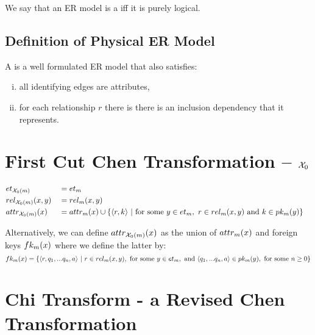 \noindent
We say that an ER model is a  iff it is purely logical.

\subsection{Definition of Physical ER Model}
\begin{definition}
\noindent 
A  is a well formulated ER model that also satisfies:
\begin{enumerate}[(i)]
\item
all identifying edges are attributes, 

\item
for each relationship $r$ there is there is an inclusion dependency that it represents.
\end{enumerate} 
\end{definition}


\section{First Cut Chen Transformation -- $\chiZero$}

\begin{align}
&\et[\chiZeroM]        && = \et        && \\
&\rel[\chiZeroM]{x}{y} && = \rel{x}{y}  &&\\
&\attr[\chiZeroM]{x}   && = \attr{x}  \cup  \setsuchthat{\tuple{r,k}}{\text{for some }
			                  y \in \et, \ r \in \rel{x}{y} \text{ and } k \in \pk{y}} 
\end{align}

Alternatively, we can define $\attr[\chiZeroM]{x}$ as the union of $\attr{x}$ and foreign keys $\fk{x}$
where we define the latter by:
\begin{equation}
\fk{x} = \setsuchthat{\tuple{r,q_1,...q_n,a}}
                               {r \in \rel{x}{y},
                                  \text{ for some } y \in \et,
																	\text{ and } \tuple{q_1,...q_n,a} \in \pk{y},
																	\text{ for some } n \geq 0
			                   }
\end{equation}

\section{Chi Transform - a Revised Chen Transformation}

